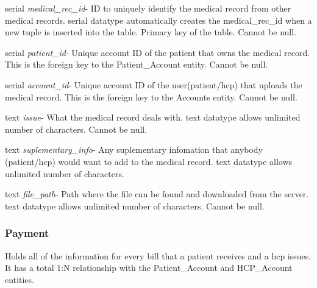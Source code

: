 \documentclass[12pt]{report}
\begin{document}
\begin{description}
\item serial \textit{medical\_rec\_id}- ID to uniquely identify the medical record from other medical records. serial datatype automatically creates the medical\_rec\_id when a new tuple is inserted into the table.  Primary key of the table.  Cannot be null.
\item serial \textit{patient\_id}- Unique account ID of the patient that owns the medical record.  This is the foreign key to the Patient\_Account entity.  Cannot be null.
\item serial \textit{account\_id}- Unique account ID of the user(patient/hcp) that uploads the medical record.  This is the foreign key to the Accounts entity.  Cannot be null.
\item text \textit{issue}-  What the medical record deals with.  text datatype allows unlimited number of characters.  Cannot be null.
\item text \textit{suplementary\_info}- Any suplementary infomation that anybody (patient/hcp) would want to add to the medical record.  text datatype allows unlimited number of characters.
\item text \textit{file\_path}- Path where the file can be found and downloaded from the server.  text datatype allows unlimited number of characters.  Cannot be null.
\end{description}

\subsubsection{Payment}
Holds all of the information for every bill that a patient receives and a hcp issues.  It has a total 1:N relationship with the Patient\_Account and HCP\_Account entities.
\end{document}
